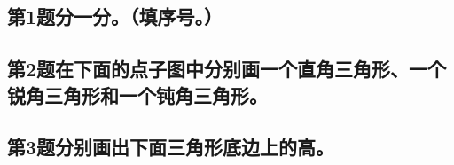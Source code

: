 \subsection*{第1题\quad 分一分。（填序号。）}
\subsection*{第2题\quad 在下面的点子图中分别画一个直角三角形、一个锐角三角形和一个钝角三角形。}
\subsection*{第3题\quad 分别画出下面三角形底边上的高。}
